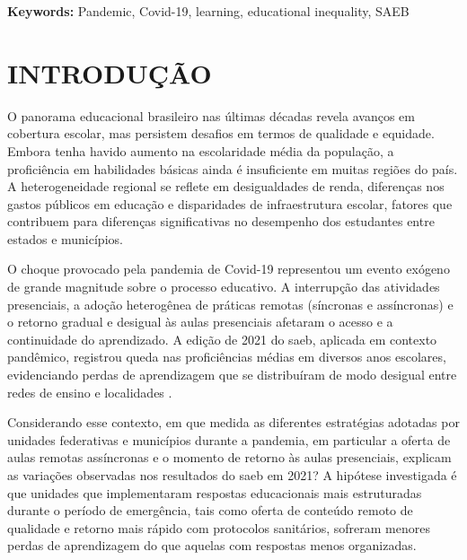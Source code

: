 \documentclass[
	12pt,				%
	openright,			%
	oneside,			%
	a4paper,			%
	brazil,				%
	]{article}
\begin{document}
\noindent\textbf{Keywords:} Pandemic, Covid-19, learning, educational inequality, SAEB
\endgroup

\newpage
\thispagestyle{empty}
{
\hypersetup{linkcolor=black}
\tableofcontents
}
\newpage

\printglossary[type=\acronymtype,title=\center{\MakeUppercase{Lista de abreviaturas e siglas}}]

\newpage

\section{INTRODUÇÃO} \label{sec:introducao}


O panorama educacional brasileiro nas últimas décadas revela avanços em
cobertura escolar, mas persistem desafios em termos de qualidade e equidade.
Embora tenha havido aumento na escolaridade média da população,
a proficiência em habilidades básicas ainda é insuficiente em muitas regiões do
país. A heterogeneidade regional se reflete em desigualdades de renda,
diferenças nos gastos públicos em educação e disparidades de infraestrutura
escolar, fatores que contribuem para diferenças significativas no desempenho dos
estudantes entre estados e municípios.

O choque provocado pela pandemia de Covid-19 representou um evento exógeno de
grande magnitude sobre o processo educativo. A interrupção das atividades
presenciais, a adoção heterogênea de práticas remotas (síncronas e
assíncronas) e o retorno gradual e desigual às aulas presenciais afetaram o
acesso e a continuidade do aprendizado. A edição de 2021 do \acrshort{saeb},
aplicada em contexto pandêmico, registrou queda nas proficiências médias em
diversos anos escolares, evidenciando perdas de aprendizagem que se
distribuíram de modo desigual entre redes de ensino e localidades
\cite{BofMoraes2022_ImpactosPandemiaAprendizado}.

Considerando esse contexto, em que medida as diferentes estratégias adotadas por
unidades federativas e municípios durante a pandemia, em particular a oferta de
aulas remotas assíncronas e o momento de retorno às aulas presenciais, explicam
as variações observadas nos resultados do \acrshort{saeb} em 2021? A hipótese
investigada é que unidades que implementaram respostas educacionais mais
estruturadas durante o período de emergência, tais como oferta de conteúdo
remoto de qualidade e retorno mais rápido com protocolos sanitários, sofreram menores
perdas de aprendizagem do que aquelas com respostas menos organizadas.
\end{document}
